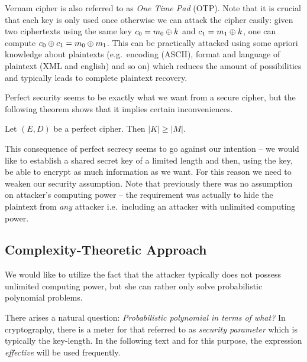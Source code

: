 \begin{note}
	Vernam cipher is also referred to as {\em One Time Pad} (OTP). Note that it is crucial that each key is only used once otherwise we can attack the cipher easily: given two ciphertexts using the same key $c_0=m_0\oplus k$ and $c_1=m_1\oplus k$, one can compute $c_0\oplus c_1 = m_0\oplus m_1$. This can be practically attacked using some apriori knowledge about plaintexts (e.g.\ encoding (ASCII), format and language of plaintext (XML and english) and so on) which reduces the amount of possibilities and typically leads to complete plaintext recovery.
\end{note}

Perfect security seems to be exactly what we want from a secure cipher, but the following theorem shows that it implies certain inconveniences.

\begin{thm}
\label{thm:kgeqm}
	Let $(E,D)$ be a perfect cipher. Then $|K| \geq |M|$.
\end{thm}

\begin{note}
\label{note:intent}
	This consequence of perfect secrecy seems to go against our intention -- we would like to establish a shared secret key of a limited length and then, using the key, be able to encrypt as much information as we want. For this reason we need to weaken our security assumption. Note that previously there was no assumption on attacker's computing power -- the requirement was actually to hide the  plaintext from {\em any} attacker i.e.\ including an attacker with unlimited computing power.
\end{note}



\subsection{Complexity-Theoretic Approach}

We would like to utilize the fact that the attacker typically does not possess unlimited computing power, but she can rather only solve probabilistic polynomial problems.

\begin{note}
\label{note:polyinterms}
	There arises a natural question: {\em Probabilistic polynomial in terms of what?} In cryptography, there is a meter for that referred to as {\em security parameter} which is typically the key-length. In the following text and for this purpose, the expression {\em effective} will be used frequently.
\end{note}

